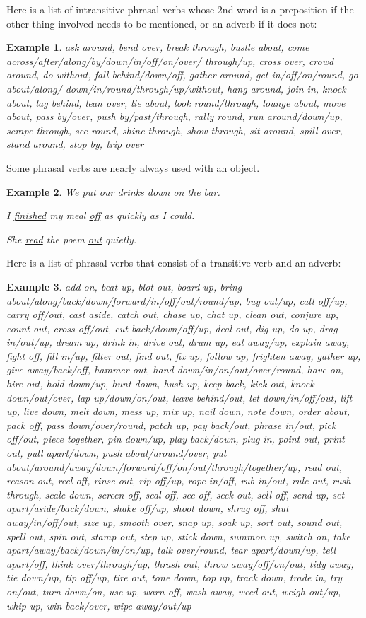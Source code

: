 \documentclass[oneside]{book}
\numberwithin{equation}{section}
\newtheorem{example}{Example}[section]
\begin{document}
%
\noindent{} Here is a list of intransitive phrasal verbs whose 2nd word is a preposition if the other thing involved needs to be mentioned, or an adverb if it does not:
\begin{example}
    ask around, bend over, break through, bustle about, come across/after/along/by/down/in/off/on/over/ through/up, cross over, crowd around, do without, fall behind/down/off, gather around, get in/off/on/round, go about/along/ down/in/round/through/up/without, hang around, join in, knock about, lag behind, lean over, lie about, look round/through, lounge about, move about, pass by/over, push by/past/through, rally round, run around/down/up, scrape through, see round, shine through, show through, sit around, spill over, stand around, stop by, trip over
\end{example}
%
\noindent{} Some phrasal verbs are nearly always used with an object.
\begin{example}
    We \underline{put} our drinks \underline{down} on the bar.
    
    I \underline{finished} my meal \underline{off} as quickly as I could.
    
    She \underline{read} the poem \underline{out} quietly.
\end{example}
%
\noindent{} Here is a list of phrasal verbs that consist of a transitive verb and an adverb:
\begin{example}
    add on, beat up, blot out, board up, bring about/along/back/down/forward/in/off/out/round/up, buy out/up, call off/up, carry off/out, cast aside, catch out, chase up, chat up, clean out, conjure up, count out, cross off/out, cut back/down/off/up, deal out, dig up, do up, drag in/out/up, dream up, drink in, drive out, drum up, eat away/up, explain away, fight off, fill in/up, filter out, find out, fix up, follow up, frighten away, gather up, give away/back/off, hammer out, hand down/in/on/out/over/round, have on, hire out, hold down/up, hunt down, hush up, keep back, kick out, knock down/out/over, lap up/down/on/out, leave behind/out, let down/in/off/out, lift up, live down, melt down, mess up, mix up, nail down, note down, order about, pack off, pass down/over/round, patch up, pay back/out, phrase in/out, pick off/out, piece together, pin down/up, play back/down, plug in, point out, print out, pull apart/down, push about/around/over, put about/around/away/down/forward/off/on/out/through/together/up, read out, reason out, reel off, rinse out, rip off/up, rope in/off, rub in/out, rule out, rush through, scale down, screen off, seal off, see off, seek out, sell off, send up, set apart/aside/back/down, shake off/up, shoot down, shrug off, shut away/in/off/out, size up, smooth over, snap up, soak up, sort out, sound out, spell out, spin out, stamp out, step up, stick down, summon up, switch on, take apart/away/back/down/in/on/up, talk over/round, tear apart/down/up, tell apart/off, think over/through/up, thrash out, throw away/off/on/out, tidy away, tie down/up, tip off/up, tire out, tone down, top up, track down, trade in, try on/out, turn down/on, use up, warn off, wash away, weed out, weigh out/up, whip up, win back/over, wipe away/out/up
\end{example}
\end{document}
